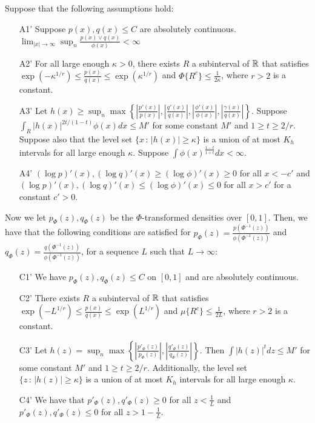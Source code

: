 \documentclass{article}
\begin{document}
\begin{proposition}
\label{prop:transformation2}
Suppose that the following assumptions hold:
\begin{enumerate}
\item[A1'] Suppose $p(x), q(x) \leq C$ are absolutely continuous.  $\lim_{|x| \rightarrow \infty} \sup_n \frac{p(x) \vee q(x)}{\phi(x)} < \infty$
\item[A2'] For all large enough $\kappa > 0$, there exists $R$ a subinterval of ${\mathbb R}$ that satisfies $\exp(-\kappa^{1/r}) \leq \frac{p(x)}{q(x)} \leq \exp(\kappa^{1/r})$ and $\Phi \{ R^c \} \leq \frac{1}{2\kappa}$, where $r > 2$ is a constant.
\item[A3'] {Let $h(x) \geq \sup_n \max \left\{  \left|\frac{p'(x)}{p(x)} \right|, 
 \left|\frac{q'(x)}{q(x)}\right|, \left| \frac{\phi'(x)}{\phi(x)}\right|, \left| \frac{\gamma(x)}{q(x)}\right| \right\} $. Suppose $\int_R |h(x)|^{2t/(1-t)} \phi(x) dx \leq M'$ for some constant $M'$ and $1 \geq t \geq 2/r$. Suppose also that the level set $\{x \,:\, |h(x)| \geq \kappa\}$ is a union of at most $K_h$ intervals for all large enough $\kappa$. Suppose $\int \phi(x)^{\frac{1-t}{1+t}} dx < \infty$.}
\item[A4']  $(\log p)'(x), (\log q)'(x) \geq (\log \phi)'(x) \geq 0$ for all $x < -c'$ and $ (\log p)'(x), (\log q)'(x) \leq (\log \phi)'(x) \leq 0$ for all $x > c'$ for a constant $c' > 0$.
\end{enumerate}

Now we let $p_\Phi(z), q_\Phi(z)$ be the $\Phi$-transformed densities over $[0,1]$.
Then, we have that the following conditions are satisfied for $p_\Phi(z) = \frac{p(\Phi^{-1}(z))}{\phi(\Phi^{-1}(z))}$ and $q_\Phi(z) = \frac{q(\Phi^{-1}(z))}{\phi(\Phi^{-1}(z))}$, for a sequence $L$ such that $L \rightarrow \infty$:
\begin{enumerate}
\item[C1'] We have $p_\Phi(z), q_\Phi(z) \leq C$ on $[0,1]$ and are absolutely continuous.
\item[C2'] There exists $R$ a subinterval of ${\mathbb R}$ that satisfies $\exp(-L^{1/r}) \leq \frac{p(x)}{q(x)} \leq \exp(L^{1/r})$ and $\mu \{ R^c \} \leq \frac{1}{2L}$, where $r > 2$ is a constant.
\item[C3'] Let $h(z) = \sup_n \max \left\{  \left|\frac{p'_\Phi(z)}{p_\Phi(z)} \right|, 
 \left|\frac{q'_\Phi(z)}{q_\Phi(z)}\right|  \right\} $. Then $\int |h(z)|^t dz \leq M'$ for some constant $M'$ and $1 \geq t \geq 2/r$. Additionally, the level set $\{z \,:\, |h(z)| \geq \kappa\}$ is a union of at most $K_h$ intervals for all large enough $\kappa$.  
\item[C4']  We have that $p'_\Phi(z), q'_\Phi(z) \geq 0$ for all $z < \frac{1}{L}$ and $p'_\Phi(z), q'_\Phi(z) \leq 0$ for all $z > 1-\frac{1}{L}$. 
\end{enumerate}

\end{proposition}
\end{document}
